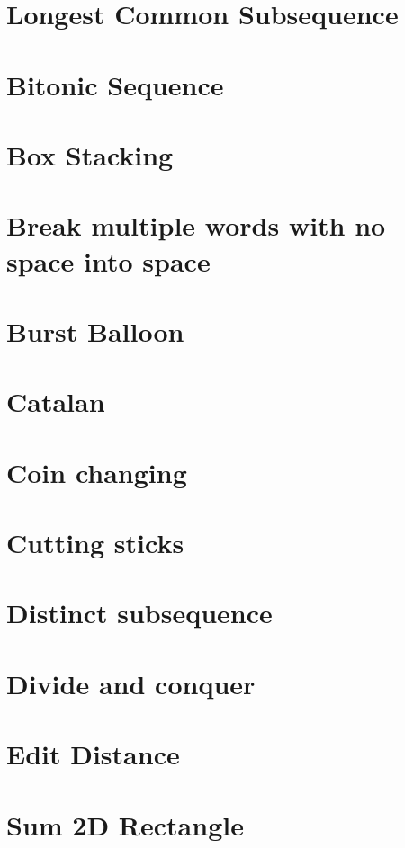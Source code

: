 \documentclass[oneside]{book}
\begin{document}
	\section{Longest Common Subsequence}
	
	\section{Bitonic Sequence}
	
	\section{Box Stacking}
	
	\section{Break multiple words with no space into space}
	
	\section{Burst Balloon}
	
	\section{Catalan}
	
	\section{Coin changing}
	
	\section{Cutting sticks}
	
	\section{Distinct subsequence}
	
	\section{Divide and conquer}
	
	\section{Edit Distance}
	
	\section{Sum 2D Rectangle}
	
\end{document}

